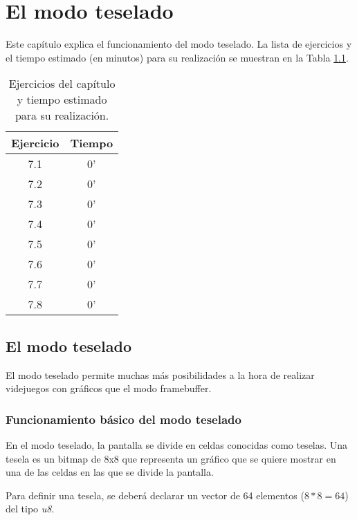 \chapter{El modo teselado}

Este capítulo explica el funcionamiento del modo teselado. La lista de ejercicios y el tiempo estimado (en minutos) para su realización se muestran en la Tabla \ref{c7_tab:ejercios}.

\begin{table}[t]
	\centering
	\caption{Ejercicios del capítulo y tiempo estimado para su realización.}
	\begin{tabular}{|c|c|}
		\hline 
		Ejercicio & Tiempo \\ 
		\hline 
		7.1 & 0' \\ 
		7.2 & 0' \\ 
		7.3 & 0' \\ 
		7.4 & 0' \\ 
		7.5 & 0' \\ 
		7.6 & 0' \\ 
		7.7 & 0' \\ 
		7.8 & 0' \\ 
		\hline 
	\end{tabular} 
	\label{c7_tab:ejercios}
\end{table}



\section{El modo teselado}
El modo teselado permite muchas más posibilidades a la hora de realizar videjuegos con gráficos que el modo framebuffer. 

\subsection{Funcionamiento básico del modo teselado}
En el modo teselado, la pantalla se divide en celdas conocidas como teselas. Una tesela es un bitmap de 8x8 que representa un gráfico que se quiere mostrar en una de las celdas en las que se divide la pantalla. 

Para definir una tesela, se deberá declarar un vector de 64 elementos ($8*8=64$) del tipo \textit{u8}. 

